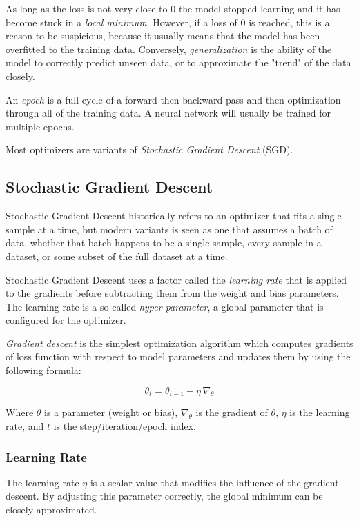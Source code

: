 \documentclass[a4paper]{article}
\begin{document}
As long as the loss is not very close to 0 the model stopped learning and it has become stuck in a \emph{local minimum}. However, if a loss of 0 is reached, this is a reason to be suspicious, because it usually means that the model has been overfitted to the training data. Conversely, \emph{generalization} is the ability of the model to correctly predict unseen data, or to approximate the "trend" of the data closely.

An \emph{epoch} is a full cycle of a forward then backward pass and then optimization through all of the training data. A neural network will usually be trained for multiple epochs.

Most optimizers are variants of \emph{Stochastic Gradient Descent} (SGD).

\subsection*{Stochastic Gradient Descent}
Stochastic Gradient Descent historically refers to an optimizer that fits a single sample at a time, but modern variants is seen as one that assumes a batch of data, whether that batch happens to be a single sample, every sample in a dataset, or some subset of the full dataset at a time.

Stochastic Gradient Descent uses a factor called the \emph{learning rate} that is applied to the gradients before subtracting them from the weight and bias parameters. The learning rate is a so-called \emph{hyper-parameter}, a global parameter that is configured for the optimizer.

\emph{Gradient descent} is the simplest optimization algorithm which computes gradients of loss function with respect to model parameters and updates them by using the following formula:

\begin{equation*}
    \theta_t = \theta_{t-1} - \eta \, \nabla_\theta
\end{equation*}

Where $\theta$ is a parameter (weight or bias), $\nabla_\theta$ is the gradient of $\theta$, $\eta$ is the learning rate, and $t$ is the step/iteration/epoch index. 

\subsubsection*{Learning Rate}
The learning rate $\eta$ is a scalar value that modifies the influence of the gradient descent. By adjusting this parameter correctly, the global minimum can be closely approximated. 
\end{document}
